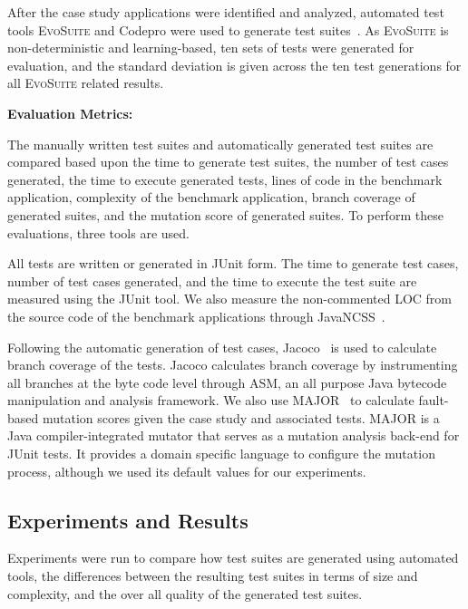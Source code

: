 After the case study applications were identified and analyzed, automated test tools \textsc{EvoSuite} and Codepro were used to generate test suites~\cite{CodePro1, fraser:2011:eat:2025113.2025179}. As \textsc{EvoSuite} is non-deterministic and learning-based, ten sets of tests were generated for evaluation, and the standard deviation is given across the ten test generations for all \textsc{EvoSuite} related results.  

\noindent \textbf{Evaluation Metrics:}

The manually written test suites and automatically generated test suites are compared based upon the time to generate test suites, the number of test cases generated, the time to execute generated tests, lines of code in the benchmark application, complexity of the benchmark application, branch coverage of generated suites, and the mutation score of generated suites. To perform these evaluations, three tools are used.

All tests are written or generated in JUnit form.  The time to generate test cases, number of test cases generated, and the time to execute the test suite are measured using the JUnit tool.  We also measure the non-commented LOC from the source code of the benchmark applications through JavaNCSS~\cite{leejavancss}.  

Following the automatic generation of test cases, Jacoco~\cite{jacoco} is used to calculate branch coverage of the tests.  Jacoco calculates branch coverage by instrumenting all branches at the byte code level through ASM, an all purpose Java bytecode manipulation and analysis framework. We also use MAJOR~\cite{just2011} to calculate fault-based mutation scores given the case study and associated tests. MAJOR is a Java compiler-integrated mutator that serves as a mutation analysis back-end for JUnit tests.  It provides a domain specific language to configure the mutation process, although we used its default values for our experiments.

\subsection{Experiments and Results}
Experiments were run to compare how test suites are generated using automated tools, the differences between the resulting test suites in terms of size and complexity, and the over all quality of the generated test suites.  

